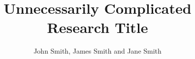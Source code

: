 \documentclass[final]{beamer}
\title{Unnecessarily Complicated Research Title} %
\author{John Smith, James Smith and Jane Smith} %
\institute{Department and University Name} %
\newlength{\sepwid}
\newlength{\onecolwid}
\begin{document}

\setlength{\belowcaptionskip}{2ex} %
\setlength\belowdisplayshortskip{2ex} %

\begin{frame}[t]




\vspace{20mm}

\begin{columns}[t,totalwidth=\paperwidth]

    \begin{column}{\sepwid}\end{column}

    \begin{column}{\onecolwid}\vspace{-.6in}
        
    \end{column} %
    
    \begin{column}{\onecolwid}\vspace{-.6in}
        
    \end{column}
    
    \begin{column}{\onecolwid}\vspace{-.6in}
        
    \end{column}
    
    \begin{column}{\sepwid}\end{column}

\end{columns}

\vfill

\begin{columns}[t,totalwidth=\paperwidth]


\end{columns}
\end{frame}
\end{document}
